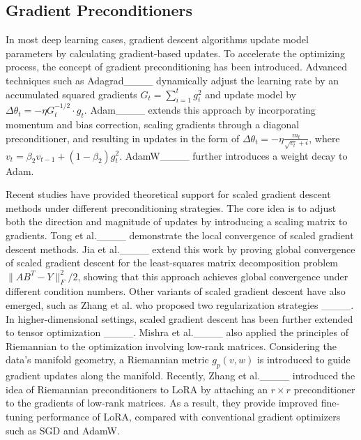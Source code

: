 \subsection{Gradient Preconditioners}
In most deep learning cases, gradient descent algorithms update model parameters by calculating gradient-based updates. To accelerate the optimizing process, the concept of gradient preconditioning has been introduced. Advanced techniques such as Adagrad____ dynamically adjust the learning rate by an accumulated squared gradients \( G_t = \sum_{i=1}^{t} g_i^2 \) and update model by \( \Delta \theta_t = -\eta G_t^{-1/2} \cdot g_t \). Adam____ extends this approach by incorporating momentum and bias correction, scaling gradients through a diagonal preconditioner, and resulting in updates in the form of \( \Delta \theta_t = -\eta \frac{m_t}{\sqrt{v_t} + \epsilon} \), where \( v_t = \beta_2 v_{t-1} + (1 - \beta_2) g_t^2 \). AdamW____ further introduces a weight decay to Adam. 

Recent studies have provided theoretical support for scaled gradient descent methods under different preconditioning strategies. The core idea is to adjust both the direction and magnitude of updates by introducing a scaling matrix to gradients.  
Tong et al.____ demonstrate the local convergence of scaled gradient descent methods. Jia et al.____ extend this work by proving global convergence of scaled gradient descent for the least-squares matrix decomposition problem \( \|AB^T - Y\|_F^2 / 2 \), showing that this approach achieves global convergence under different condition numbers. Other variants of scaled gradient descent have also emerged, such as Zhang et al. who proposed two regularization strategies ____. In higher-dimensional settings, scaled gradient descent has been further extended to tensor optimization ____. Mishra et al.____ also applied the principles of Riemannian to the optimization involving low-rank matrices. Considering the data's manifold geometry, a Riemannian metric $g_p(v, w)$ is introduced to guide gradient updates along the manifold. Recently, Zhang et al.____ introduced the idea of Riemannian preconditioners to LoRA by attaching an \( r \times r \) preconditioner to the gradients of low-rank matrices. As a result, they provide improved fine-tuning performance of LoRA, compared with conventional gradient optimizers such as SGD and AdamW.